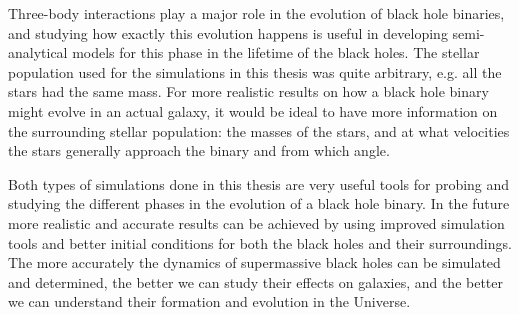 \documentclass[english, oneside]{HYgradu}
\begin{document}
Three-body interactions play a major role in the evolution of black hole binaries, and studying how exactly this evolution happens is useful in developing semi-analytical models for this phase in the lifetime of the black holes. The stellar population used for the simulations in this thesis was quite arbitrary, e.g. all the stars had the same mass. For more realistic results on how a black hole binary might evolve in an actual galaxy, it would be ideal to have more information on the surrounding stellar population: the masses of the stars, and at what velocities the stars generally approach the binary and from which angle. 

Both types of simulations done in this thesis are very useful tools for probing and studying the different phases in the evolution of a black hole binary. In the future more realistic and accurate results can be achieved by using improved simulation tools and better initial conditions for both the black holes and their surroundings. The more accurately the dynamics of supermassive black holes can be simulated and determined, the better we can study their effects on galaxies, and the better we can understand their formation and evolution in the Universe.


\clearpage
{} %

\small

\label{pagecount}
\end{document}
